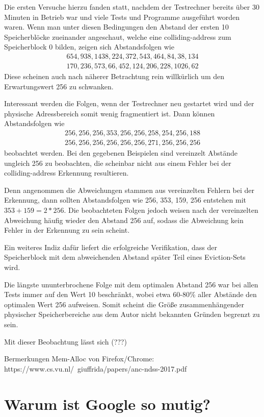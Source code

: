 Die ersten Versuche hierzu fanden statt, nachdem der Testrechner bereits über 30 Minuten in Betrieb war und viele Tests und Programme ausgeführt worden waren.
Wenn man unter diesen Bedingungen den Abstand der ersten 10 Speicherblöcke zueinander angeschaut, welche eine colliding-address zum Speicherblock 0 bilden, zeigen sich Abstandsfolgen wie 
\begin{align*} 
654, 938, 1438, 224, 372, 543, 464, 84, 38, 134\\
170, 236, 573, 66, 452, 124, 206, 228, 1026, 62
\end{align*}
Diese scheinen auch nach näherer Betrachtung rein willkürlich um den Erwartungswert 256 zu schwanken.

Interessant werden die Folgen, wenn der Testrechner neu gestartet wird und der physische Adressbereich somit wenig fragmentiert ist.
Dann können Abstandsfolgen wie 
\begin{align*} 
256, 256, 256, 353, 256, 256, 258, 254, 256, 188\\
256, 256, 256, 256, 256, 256, 271, 256, 256, 256
\end{align*}
beobachtet werden.
Bei den gegebenen Beispielen sind vereinzelt Abstände %
ungleich 256 zu beobachten, die scheinbar nicht aus einem Fehler bei der colliding-address Erkennung resultieren.

Denn angenommen die Abweichungen stammen aus vereinzelten Fehlern bei der Erkennung, dann sollten Abstandsfolgen wie 256, 353, 159, 256 entstehen mit $353+159=2*256$.
Die beobachteten Folgen jedoch weisen nach der vereinzelten Abweichung häufig wieder den Abstand 256 auf, sodass die Abweichung kein Fehler in der Erkennung zu sein scheint.

Ein weiteres Indiz dafür liefert die erfolgreiche Verifikation, dass der Speicherblock mit dem abweichenden Abstand später Teil eines Eviction-Sets wird.

Die längste ununterbrochene Folge mit dem optimalen Abstand 256 war bei allen Tests immer auf den Wert 10 beschränkt, wobei etwa 60-80\% aller Abstände den optimalen Wert 256 aufweisen.
Somit scheint die Größe zusammenhängender physischer Speicherbereiche aus dem Autor nicht bekannten Gründen begrenzt zu sein.

Mit dieser Beobachtung lässt sich (???)

Bermerkungen Mem-Alloc von Firefox/Chrome: https://www.cs.vu.nl/~giuffrida/papers/anc-ndss-2017.pdf
\cite{ASLROnTheLine}

\section{Warum ist Google so mutig?}
\label{GooglePageIsolation}

